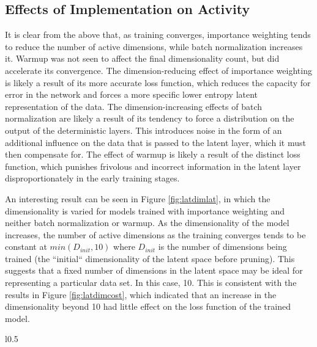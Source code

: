 \documentclass{article} %
\numberwithin{figure}{section}
\begin{document}
\subsection{Effects of Implementation on Activity}
It is clear from the above that, as training converges, importance weighting tends to reduce the number of active dimensions, while batch normalization increases it. Warmup was not seen to affect the final dimensionality count, but did accelerate its convergence. The dimension-reducing effect of importance weighting is likely a result of its more accurate loss function, which reduces the capacity for error in the network and forces a more specific lower entropy latent representation of the data. The dimension-increasing effects of batch normalization are likely a result of its tendency to force a distribution on the output of the deterministic layers. This introduces noise in the form of an additional influence on the data that is passed to the latent layer, which it must then compensate for. The effect of warmup is likely a result of the distinct loss function, which punishes frivolous and incorrect information in the latent layer disproportionately in the early training stages.
\par An interesting result can be seen in Figure \ref{fig:latdimlat}, in which the dimensionality is varied for models trained with importance weighting and neither batch normalization or warmup. As the dimensionality of the model increases, the number of active dimensions as the training converges tends to be constant at $min(D_{init},10)$ where $D_{init}$ is the number of dimensions being trained (the ``initial`` dimensionality of the latent space before pruning). This suggests that a fixed number of dimensions in the latent space may be ideal for representing a particular data set. In this case, 10. This is consistent with the results in Figure \ref{fig:latdimcost}, which indicated that an increase in the dimensionality beyond 10 had little effect on the loss function of the trained model.
\begin{wrapfigure}{l}{0.5\textwidth}
  \resizebox{\linewidth}{!}{}
  \caption{Effect of Latent Dimensionality}
  \label{fig:latdimlat}
\end{wrapfigure}
\end{document}
